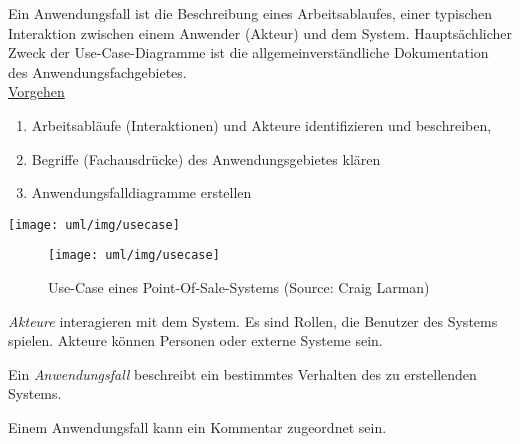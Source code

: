 \begin{minipage}[c]{0.45\linewidth}
\ifslides
\newpage
\fi
Ein Anwendungsfall ist die Beschreibung eines Arbeitsablaufes, einer
typischen Interaktion zwischen einem Anwender (Akteur) und dem System.
Hauptsächlicher Zweck der Use-Case-Diagramme ist die allgemeinverständliche
Dokumentation des Anwendungsfachgebietes.\\[2ex]
\underline{Vorgehen}
\begin{enumerate}
\item Arbeitsabläufe (Interaktionen) und Akteure identifizieren
   und beschreiben,
\item Begriffe (Fachausdrücke) des Anwendungsgebietes klären
\item Anwendungsfalldiagramme erstellen
\end{enumerate}
\newpage
\ifslides
\begin{center}
\texttt{[image: uml/img/usecase]}
\end{center}
\else
\begin{figure}[H]
\texttt{[image: uml/img/usecase]}
\caption{Use-Case eines Point-Of-Sale-Systems (Source: Craig Larman)}
\end{figure}
\fi
\emph{Akteure} interagieren mit dem System. Es sind Rollen, die
Benutzer des Systems spielen. Akteure können Personen oder externe
Systeme sein.
%

Ein \emph{Anwendungsfall} beschreibt ein bestimmtes Verhalten des zu
erstellenden Systems.
%

Einem Anwendungsfall kann ein Kommentar zugeordnet sein.
%


\end{minipage}
